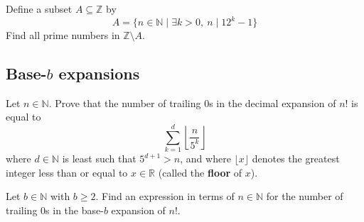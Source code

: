 \begin{chapex}
Define a subset $A \subseteq \mathbb{Z}$ by
\[ A = \{ n \in \mathbb{N} \mid \exists k > 0,~ n \mid 12^k-1 \} \]
Find all prime numbers in $\mathbb{Z} \setminus A$.
\end{chapex}

\subsection*{Base-$b$ expansions}

\begin{chapex}
Let $n \in \mathbb{N}$. Prove that the number of trailing $0$s in the decimal expansion of $n!$ is equal to
\[ \sum_{k=1}^d \left\lfloor \dfrac{n}{5^k} \right \rfloor \]
where $d \in \mathbb{N}$ is least such that $5^{d+1}>n$, and where $\lfloor x \rfloor$  denotes the greatest integer less than or equal to $x \in \mathbb{R}$ (called the \textbf{floor} of $x$).
\end{chapex}

\begin{chapex}
Let $b \in \mathbb{N}$ with $b \ge 2$. Find an expression in terms of $n \in \mathbb{N}$ for the number of trailing $0$s in the base-$b$ expansion of $n!$.
\end{chapex}
